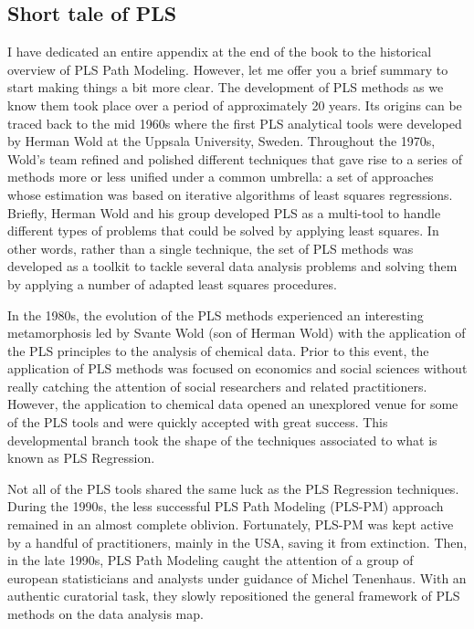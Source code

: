 \documentclass[12pt]{book}\usepackage{graphicx, color}
\begin{document}
\subsection{Short tale of PLS}
I have dedicated an entire appendix at the end of the book to the historical overview of PLS Path Modeling. However, let me offer you a brief summary to start making things a bit more clear. The development of PLS methods as we know them took place over a period of approximately 20 years. Its origins can be traced back to the mid 1960s where the first PLS analytical tools were developed by Herman Wold at the Uppsala University, Sweden. Throughout the 1970s, Wold's team refined and polished different techniques that gave rise to a series of methods more or less unified under a common umbrella: a set of approaches whose estimation was based on iterative algorithms of least squares regressions. Briefly, Herman Wold and his group developed PLS as a multi-tool to handle different types of problems that could be solved by applying least squares. In other words, rather than a single technique, the set of PLS methods was developed as a toolkit to tackle several data analysis problems and solving them by applying a number of adapted least squares procedures.

In the 1980s, the evolution of the PLS methods experienced an interesting metamorphosis led by Svante Wold (son of Herman Wold) with the application of the PLS principles to the analysis of chemical data. Prior to this event, the application of PLS methods was focused on economics and social sciences without really catching the attention of social researchers and related practitioners. However, the application to chemical data opened an unexplored venue for some of the PLS tools and were quickly accepted with great success. This developmental branch took the shape of the techniques associated to what is known as PLS Regression.

Not all of the PLS tools shared the same luck as the PLS Regression techniques. During the 1990s, the less successful PLS Path Modeling (PLS-PM) approach remained in an almost complete oblivion. Fortunately, PLS-PM was kept active by a handful of practitioners, mainly in the USA, saving it from extinction. Then, in the late 1990s, PLS Path Modeling caught the attention of a group of european statisticians and analysts under guidance of Michel Tenenhaus. With an authentic curatorial task, they slowly repositioned the general framework of PLS methods on the data analysis map.    
\end{document}
